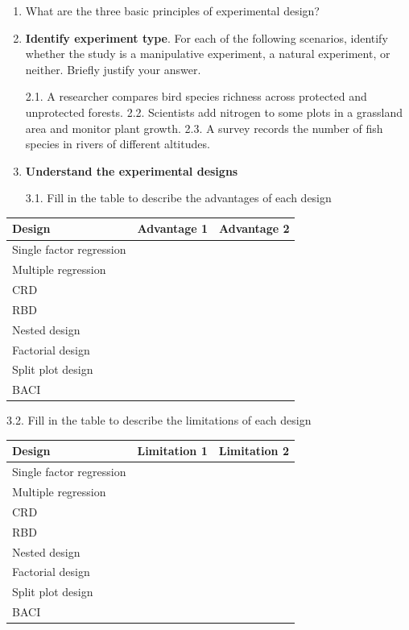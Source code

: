 \documentclass[
]{book}
\newcounter{none} %
\begin{document}
\begin{enumerate}
\def\labelenumi{\arabic{enumi}.}
\item
  What are the three basic principles of experimental design?
\item
  \textbf{Identify experiment type}. For each of the following scenarios, identify whether the study is a manipulative experiment, a natural experiment, or neither. Briefly justify your answer.

  2.1. A researcher compares bird species richness across protected and unprotected forests.
  2.2. Scientists add nitrogen to some plots in a grassland area and monitor plant growth.
  2.3. A survey records the number of fish species in rivers of different altitudes.
\item
  \textbf{Understand the experimental designs}

  3.1. Fill in the table to describe the advantages of each design
\end{enumerate}

{\def\LTcaptype{none} %
\begin{longtable}[]{@{}lll@{}}
\toprule\noalign{}
Design & Advantage 1 & Advantage 2 \\
\midrule\noalign{}
\endhead
\bottomrule\noalign{}
\endlastfoot
Single factor regression & & \\
Multiple regression & & \\
CRD & & \\
RBD & & \\
Nested design & & \\
Factorial design & & \\
Split plot design & & \\
BACI & & \\
\end{longtable}
}

3.2. Fill in the table to describe the limitations of each design

{\def\LTcaptype{none} %
\begin{longtable}[]{@{}lll@{}}
\toprule\noalign{}
Design & Limitation 1 & Limitation 2 \\
\midrule\noalign{}
\endhead
\bottomrule\noalign{}
\endlastfoot
Single factor regression & & \\
Multiple regression & & \\
CRD & & \\
RBD & & \\
Nested design & & \\
Factorial design & & \\
Split plot design & & \\
BACI & & \\
\end{longtable}
}
\end{document}
